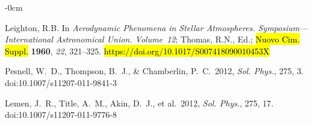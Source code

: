 \documentclass[physics,article,accept,pdftex,moreauthors]{Definitions/mdpi}
\newcommand{\aap}{{\it Astron. Astrophys.}}
\newcommand{\aaps}{{\it Astron. Astrophys. Suppl.}}
\newcommand{\apj}{{\it Astrophys. J.}}
\newcommand{\solphys}{{\it Sol. Phys.}}
\begin{document}
\begin{adjustwidth}{-\extralength}{0cm}
\begin{thebibliography}{999}
{{		
		
		{Leighton}, R.B. 
In \emph{Aerodynamic Phenomena in
			Stellar Atmospheres. Symposium---International Astronomical Union.   
Volume~12}; {Thomas}, R.N., Ed.;  \hl{Nuovo Cim. Suppl.} {\bf 1960}, {\it 22},  321--325.
		\hl{https://doi.org/10.1017/S007418090010453X} 

 Pesnell, W.~D., Thompson, B.~J., \& Chamberlin, P.~C.\ 2012, \solphys, 275, 3. doi:10.1007/s11207-011-9841-3	

 Lemen, J.~R., Title, A.~M., Akin, D.~J., et al.\ 2012, \solphys, 275, 17. doi:10.1007/s11207-011-9776-8


}}		
	\end{thebibliography}
	
	
	

\end{adjustwidth}
\end{document}

